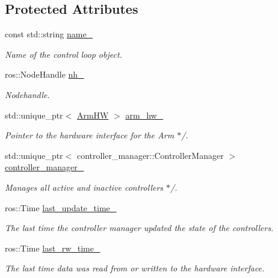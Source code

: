 \subsection*{Protected Attributes}
\begin{DoxyCompactItemize}
\item 
const std\+::string \hyperlink{classuwrt_1_1arm_1_1_arm_control_loop_a6082448e453dda1b08d3af23e156b889}{name\+\_\+}
\begin{DoxyCompactList}\small\item\em Name of the control loop object. \end{DoxyCompactList}\item 
ros\+::\+Node\+Handle \hyperlink{classuwrt_1_1arm_1_1_arm_control_loop_ac893531965c914e8ed54dfe97909be7d}{nh\+\_\+}
\begin{DoxyCompactList}\small\item\em Nodehandle. \end{DoxyCompactList}\item 
std\+::unique\+\_\+ptr$<$ \hyperlink{classuwrt_1_1arm_1_1_arm_h_w}{Arm\+HW} $>$ \hyperlink{classuwrt_1_1arm_1_1_arm_control_loop_ae28be35b3cf089ea2640f1104742cc32}{arm\+\_\+hw\+\_\+}
\begin{DoxyCompactList}\small\item\em Pointer to the hardware interface for the Arm $\ast$/. \end{DoxyCompactList}\item 
std\+::unique\+\_\+ptr$<$ controller\+\_\+manager\+::\+Controller\+Manager $>$ \hyperlink{classuwrt_1_1arm_1_1_arm_control_loop_a06f6565117c5a6052b09c1c41e9daba8}{controller\+\_\+manager\+\_\+}
\begin{DoxyCompactList}\small\item\em Manages all active and inactive controllers $\ast$/. \end{DoxyCompactList}\item 
ros\+::\+Time \hyperlink{classuwrt_1_1arm_1_1_arm_control_loop_aa9847f51f9c32be800979ac9422ba3b3}{last\+\_\+update\+\_\+time\+\_\+}
\begin{DoxyCompactList}\small\item\em The last time the controller manager updated the state of the controllers. \end{DoxyCompactList}\item 
ros\+::\+Time \hyperlink{classuwrt_1_1arm_1_1_arm_control_loop_a91b726de7d1791a6efedfaaa31344dea}{last\+\_\+rw\+\_\+time\+\_\+}
\begin{DoxyCompactList}\small\item\em The last time data was read from or written to the hardware interface. \end{DoxyCompactList}\item 

\end{DoxyCompactItemize}
